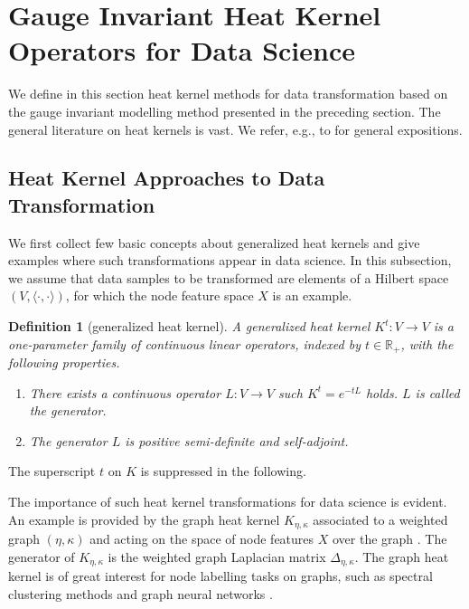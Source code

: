 \documentclass[10pt,reqno]{amsart}
\numberwithin{equation}{section}
\theoremstyle{bfnote}
\theoremstyle{bfdef}
\newtheorem{definition}[theorem]{Definition}
\newcommand{\la}{\langle}
\newcommand{\ra}{\rangle}
\newcommand{\R}{\mathbb{R}}
\providecommand\X; %
\renewcommand{\X}{X}
\providecommand\hgen; %
\renewcommand{\hgen}{L}
\begin{document}
\section{Gauge Invariant Heat Kernel Operators for Data Science}\label{sec:hks}


We define in this section heat kernel methods for data transformation based on the gauge invariant modelling method presented in the preceding section. The general literature on heat kernels is vast. We refer, e.g., to \cite{Davies:1989aa,Berline:1996aa,Grigoryan:2009aa,Avramidi:2015aa} for general expositions.

\subsection{Heat Kernel Approaches to Data Transformation}
	We first collect few basic concepts about generalized heat kernels and give examples where such transformations appear in data science.
	In this subsection, we assume that data samples to be transformed are elements of a Hilbert space $(V,\la \cdot, \cdot \ra)$, for which the node feature space $\X$ is an example.

	\begin{definition}[generalized heat kernel]
		A \textit{generalized heat kernel} $K^t : V \to V$ is a one-parameter family of continuous linear operators, indexed by $t \in \R_+$, with the following properties.
		\begin{enumerate}
			\item There exists a continuous operator $\hgen : V \to V$ such $K^t = e^{-t \hgen}$ holds. $\hgen$ is called the \textit{generator}.

			\item The generator $\hgen$ is positive semi-definite and self-adjoint.
		\end{enumerate}
	\end{definition}
	The superscript $t$ on $K$ is suppressed in the following.

	The importance of such heat kernel transformations for data science is evident.
	An example is provided by the graph heat kernel $K_{\eta,\kappa}$ associated to a weighted graph $(\eta,\kappa)$ and acting on the space of node features $\X$ over the graph \cite{Grigoryan:2011aa}. The generator of $K_{\eta,\kappa}$ is the weighted graph Laplacian matrix $\Delta_{\eta,\kappa}$. The graph heat kernel is of great interest for node labelling tasks on graphs, such as spectral clustering methods \cite{Chung:1997aa,Luxburg:2007aa} and graph neural networks \cite{kipfSemiSupervisedClassificationGraph2017a,bodnarNeuralSheafDiffusion2023,bambergerBundleNeuralNetworks2024}.
\end{document}
